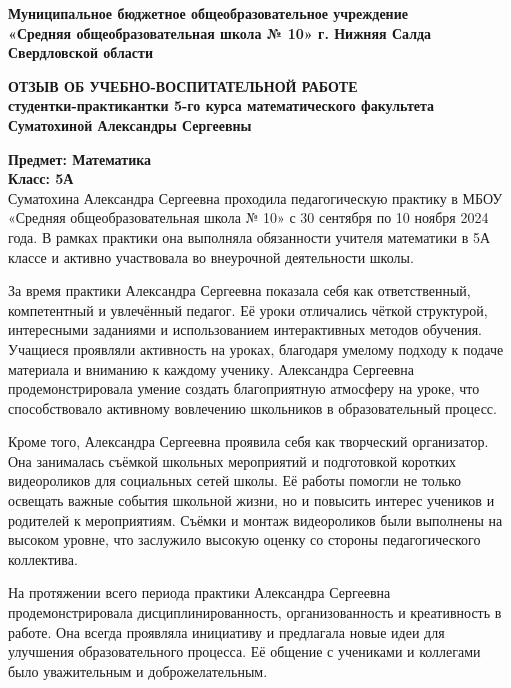 \documentclass[a4paper,12pt]{article}
\begin{document}
\begin{center}
\textbf{Муниципальное бюджетное общеобразовательное учреждение}\\
\textbf{«Средняя общеобразовательная школа № 10» г. Нижняя Салда Свердловской области}\\
\end{center}

\begin{center}
\textbf{\large ОТЗЫВ ОБ УЧЕБНО-ВОСПИТАТЕЛЬНОЙ РАБОТЕ}\\
\textbf{студентки-практикантки 5-го курса математического факультета}\\
\textbf{Суматохиной Александры Сергеевны}
\end{center}

\vspace{10mm}

\noindent
\textbf{Предмет: Математика}\\
\textbf{Класс: 5А}\\

Суматохина Александра Сергеевна проходила педагогическую практику в МБОУ «Средняя общеобразовательная школа № 10» с 30 сентября по 10 ноября 2024 года. В рамках практики она выполняла обязанности учителя математики в 5А классе и активно участвовала во внеурочной деятельности школы.

За время практики Александра Сергеевна показала себя как ответственный, компетентный и увлечённый педагог. Её уроки отличались чёткой структурой, интересными заданиями и использованием интерактивных методов обучения. Учащиеся проявляли активность на уроках, благодаря умелому подходу к подаче материала и вниманию к каждому ученику. Александра Сергеевна продемонстрировала умение создать благоприятную атмосферу на уроке, что способствовало активному вовлечению школьников в образовательный процесс.

Кроме того, Александра Сергеевна проявила себя как творческий организатор. Она занималась съёмкой школьных мероприятий и подготовкой коротких видеороликов для социальных сетей школы. Её работы помогли не только освещать важные события школьной жизни, но и повысить интерес учеников и родителей к мероприятиям. Съёмки и монтаж видеороликов были выполнены на высоком уровне, что заслужило высокую оценку со стороны педагогического коллектива.

На протяжении всего периода практики Александра Сергеевна продемонстрировала дисциплинированность, организованность и креативность в работе. Она всегда проявляла инициативу и предлагала новые идеи для улучшения образовательного процесса. Её общение с учениками и коллегами было уважительным и доброжелательным.
\end{document}
